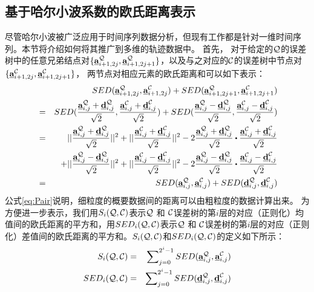 \subsection{基于哈尔小波系数的欧氏距离表示}
尽管哈尔小波被广泛应用于时间序列数据分析，但现有工作都是针对一维时间序列。本节将介绍如何将其推广到多维的轨迹数据中。
首先， 对于给定的$\cal Q$的误差树中的任意兄弟结点对$\{\emph{{\textbf{a}}}_{i+1,2j}^{\cal Q}, \emph{{\textbf{a}}}_{i+1,2j+1}^{\cal Q}\}$，以及与之对应的$\cal C$的误差树中节点对$\{\emph{{\textbf{a}}}_{i+1, 2j}^{\cal C},  \emph{{\textbf{a}}}_{i+1, 2j+1}^{\cal C} \}$，
 两节点对相应元素的欧氏距离和可以如下表示：
  \allowdisplaybreaks
 \begin{eqnarray}\label{eq:Pair}
&& SED(\va_{i+1,2j}^{\cal Q},\va_{i+1,2j}^{\cal C}) + SED(\va_{i+1,2j+1}^{\cal Q},\va_{i+1,2j+1}^{\cal C}) \\ \nonumber
&=& SED(\frac{\va_{i,j}^{\cal Q} + \vd_{i,j}^{\cal Q}}{\sqrt{2}}, \frac{\va_{i,j}^{\cal C}+ \vd_{i,j}^{\cal C}}{\sqrt{2}}) + 
SED(\frac{\va_{i,j}^{\cal Q} - \vd_{i,j}^{\cal Q}}{\sqrt{2}}, \frac{\va_{i,j}^{\cal C} - \vd_{i,j}^{\cal C}}{\sqrt{2}}) \\ \nonumber 
&=& ||\frac{\va_{i,j}^{\cal Q}+ \vd_{i,j}^{\cal Q}}{\sqrt{2}}||^2 + ||\frac{\va_{i,j}^{\cal C}+ \vd_{i,j}^{\cal C}}{\sqrt{2}}||^2 
-2 \frac{\va_{i,j}^{\cal Q}+ \vd_{i,j}^{\cal Q}}{\sqrt{2}} \bigcdot \frac{\va_{i,j}^{\cal C}+ \vd_{i,j}^{\cal C}}{\sqrt{2}}
\\ \nonumber
&&+ ||\frac{\va_{i,j}^{\cal Q} - \vd_{i,j}^{\cal Q}}{\sqrt{2}}||^2 + ||\frac{\va_{i,j}^{\cal C} - \vd_{i,j}^{\cal C}}{\sqrt{2}}||^2  -2 \frac{\va_{i,j}^{\cal Q} - \vd_{i,j}^{\cal Q}}{\sqrt{2}} \bigcdot \frac{\va_{i,j}^{\cal C} - \vd_{i,j}^{\cal C}}{\sqrt{2}}\\ \nonumber
&=& SED(\va_{i,j}^{\cal Q}, \va_{i,j}^{\cal C}) + SED(\vd_{i,j}^{\cal Q}, \vd_{i,j}^{\cal C})
 \end{eqnarray}
 \allowdisplaybreaks[4]
公式\ref{eq:Pair}说明，细粒度的概要数据间的距离可以由粗粒度的数据计算出来。
为方便进一步表示，我们用$S_{i}(\cal Q, \cal C)$表示${\cal Q}$ 和 ${\cal C}$误差树的第$i$层的对应（正则化）均值间的欧氏距离的平方和，用$SED_{i}(\cal Q, \cal C)$表示${\cal Q}$ 和 ${\cal C}$误差树的第$i$层的对应（正则化）差值间的欧氏距离的平方和。$S_{i}(\cal Q, \cal C)$和$SED_{i}(\cal Q, \cal C)$的定义如下所示：
\begin{eqnarray}\label{eq:basic}
S_{i}({\cal Q}, {\cal C})& = & \sum\nolimits_{j=0}^{2^{i}-1}SED( \emph{{\textbf{a}}}_{i,j}^{\cal Q}, \emph{{\textbf{a}}}_{i,j}^{\cal C})\label{eq:defSI}  \\
SED_{i}({\cal Q}, {\cal C}) & = & \sum\nolimits_{j=0}^{2^{i}-1}SED(\emph{{\textbf{d}}}_{i,j}^{\cal Q}, \emph{{\textbf{d}}}_{i,j}^{\cal C})   \label{eq:defSEDI}
\end{eqnarray}

